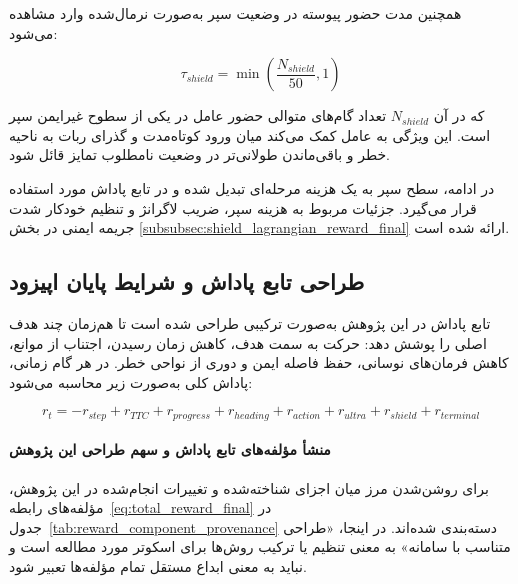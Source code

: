 همچنین مدت حضور پیوسته در وضعیت سپر به‌صورت نرمال‌شده وارد مشاهده می‌شود:

\begin{equation}
	\tau_{shield} =
	\min
	\left(
	\frac{N_{shield}}{50},
	1
	\right)
	\label{eq:shield_duration_encoding_final}
\end{equation}

که در آن \(N_{shield}\) تعداد گام‌های متوالی حضور عامل در یکی از سطوح غیرایمن سپر است. این ویژگی به عامل کمک می‌کند میان ورود کوتاه‌مدت و گذرای ربات به ناحیه خطر و باقی‌ماندن طولانی‌تر در وضعیت نامطلوب تمایز قائل شود.

در ادامه، سطح سپر به یک هزینه مرحله‌ای تبدیل شده و در تابع پاداش مورد استفاده قرار می‌گیرد. جزئیات مربوط به هزینه سپر، ضریب لاگرانژ
 و تنظیم خودکار شدت جریمه ایمنی در بخش \ref{subsubsec:shield_lagrangian_reward_final} ارائه شده است.

\subsection{طراحی تابع پاداش و شرایط پایان اپیزود}
\label{subsec:reward_design_final}

تابع پاداش در این پژوهش به‌صورت ترکیبی طراحی شده است تا هم‌زمان چند هدف اصلی را پوشش دهد: حرکت به سمت هدف، کاهش زمان رسیدن، اجتناب از موانع، کاهش فرمان‌های نوسانی، حفظ فاصله ایمن و دوری از نواحی خطر. در هر گام زمانی، پاداش کلی به‌صورت زیر محاسبه می‌شود:

\begin{equation}
	r_t =
	-r_{step}
	+r_{TTC}
	+r_{progress}
	+r_{heading}
	+r_{action}
	+r_{ultra}
	+r_{shield}
	+r_{terminal}
	\label{eq:total_reward_final}
\end{equation}

\paragraph{منشأ مؤلفه‌های تابع پاداش و سهم طراحی این پژوهش}
برای روشن‌شدن مرز میان اجزای شناخته‌شده و تغییرات انجام‌شده در این پژوهش، مؤلفه‌های رابطه~\ref{eq:total_reward_final} در جدول~\ref{tab:reward_component_provenance} دسته‌بندی شده‌اند. در اینجا، «طراحی متناسب با سامانه» به معنی تنظیم یا ترکیب روش‌ها برای اسکوتر مورد مطالعه است و نباید به معنی ابداع مستقل تمام مؤلفه‌ها تعبیر شود.

